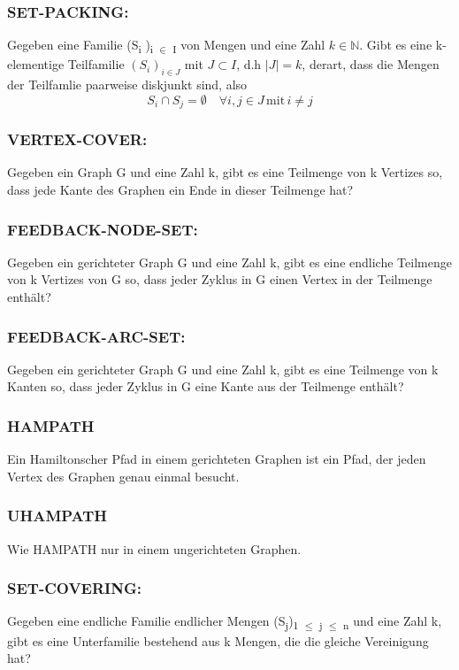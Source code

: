 \documentclass[11pt,twoside,landscape]{article}
\begin{document}
\begin{multicols}{3}
\subsubsection*{SET-PACKING:}
\label{sec:org08a6617}
Gegeben eine Familie (S\textsubscript{i} )\textsubscript{i \(\in\) I} von Mengen und eine Zahl \(k \in \mathbb{N}\). Gibt es eine k-elementige Teilfamilie \((S_i)_{i \in J}\) mit \(J \subset I\), d.h \(|J| = k\), derart, dass die Mengen der Teilfamlie paarweise diskjunkt sind, also
$$
S_i \cap S_j = \emptyset \quad \forall i, j \in J \, \text{mit} \, i \neq j
$$

\subsubsection*{VERTEX-COVER:}
\label{sec:orgb971f5f}
Gegeben ein Graph G und eine Zahl k, gibt es eine Teilmenge von k Vertizes so, dass jede Kante des Graphen ein Ende in dieser Teilmenge hat?

\subsubsection*{FEEDBACK-NODE-SET:}
\label{sec:orgdd85b2a}
Gegeben ein gerichteter Graph G und eine Zahl k, gibt es eine endliche Teilmenge von k Vertizes von G so, dass jeder Zyklus in G einen Vertex in der Teilmenge enthält?

\subsubsection*{FEEDBACK-ARC-SET:}
\label{sec:org7425fd0}
Gegeben ein gerichteter Graph G und eine Zahl k, gibt es eine Teilmenge von k Kanten so, dass jeder Zyklus in G eine Kante aus der Teilmenge enthält?

\subsubsection*{HAMPATH}
\label{sec:orge5b974c}
Ein Hamiltonscher Pfad in einem gerichteten Graphen ist ein Pfad, der jeden Vertex des Graphen genau einmal besucht.
\subsubsection*{UHAMPATH}
\label{sec:org8442e5d}
Wie HAMPATH nur in einem ungerichteten Graphen. 
\subsubsection*{SET-COVERING:}
\label{sec:org9e8a8ea}
Gegeben eine endliche Familie endlicher Mengen (S\textsubscript{j})\textsubscript{1 \(\le\) j \(\le\) n} und eine Zahl k, gibt es eine Unterfamilie bestehend aus k Mengen, die die gleiche Vereinigung hat?


\end{multicols}
\end{document}
